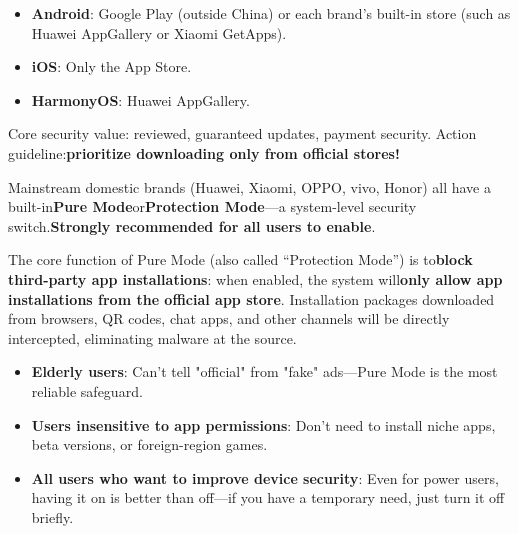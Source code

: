 


\begin{itemize}
  \item \textbf{Android}: Google Play (outside China) or each brand's built-in store (such as Huawei AppGallery or Xiaomi GetApps).
  \item \textbf{iOS}: Only the App Store.
  \item \textbf{HarmonyOS}: Huawei AppGallery.
\end{itemize}

Core security value: reviewed, guaranteed updates, payment security. Action guideline:\textbf{prioritize downloading only from official stores!}


Mainstream domestic brands (Huawei, Xiaomi, OPPO, vivo, Honor) all have a built-in\textbf{Pure Mode}or\textbf{Protection Mode}—a system-level security switch.\textbf{Strongly recommended for all users to enable}.


The core function of Pure Mode (also called “Protection Mode”) is to\textbf{block third-party app installations}: when enabled, the system will\textbf{only allow app installations from the official app store}. Installation packages downloaded from browsers, QR codes, chat apps, and other channels will be directly intercepted, eliminating malware at the source.


\begin{itemize}
  \item \textbf{Elderly users}: Can't tell "official" from "fake" ads—Pure Mode is the most reliable safeguard.
  \item \textbf{Users insensitive to app permissions}: Don't need to install niche apps, beta versions, or foreign-region games.
  \item \textbf{All users who want to improve device security}: Even for power users, having it on is better than off—if you have a temporary need, just turn it off briefly.
\end{itemize}

